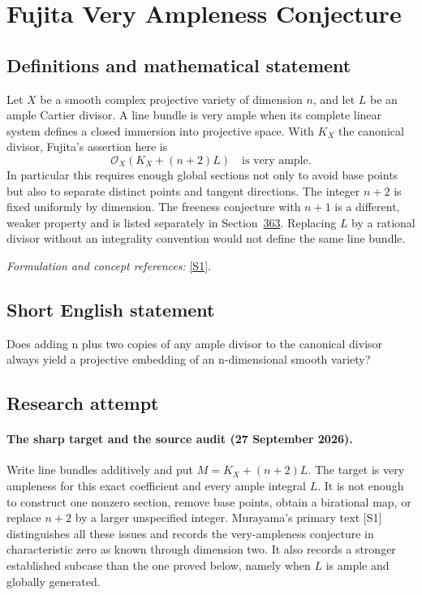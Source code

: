 \documentclass[11pt]{article}
\begin{document}
\section*{\texorpdfstring{Fujita Very Ampleness Conjecture}{Fujita Very Ampleness Conjecture}}\label{466}
\subsection{Definitions and mathematical statement}
Let $X$ be a smooth complex projective variety of dimension $n$, and let $L$ be an ample Cartier divisor. A line bundle is very ample when its complete linear system defines a closed immersion into projective space. With $K_X$ the canonical divisor, Fujita's assertion here is
\[
 \mathcal O_X(K_X+(n+2)L)\quad\text{is very ample}.
\]
In particular this requires enough global sections not only to avoid base points but also to separate distinct points and tangent directions. The integer $n+2$ is fixed uniformly by dimension. The freeness conjecture with $n+1$ is a different, weaker property and is listed separately in Section~\href{https://mehmetmars7.github.io/Erdosproblems-llm-hunter/problem.html?type=open_problems&id=problem.fujita-freeness-conjecture}{363}. Replacing $L$ by a rational divisor without an integrality convention would not define the same line bundle.
\par\smallskip\textit{Formulation and concept references:} \href{https://arxiv.org/abs/2408.06530}{[S1]}.

\subsection{Short English statement}
Does adding n plus two copies of any ample divisor to the canonical divisor always yield a projective embedding of an n-dimensional smooth variety?
\subsection{Research attempt}

\paragraph{The sharp target and the source audit (27 September 2026).}
Write line bundles additively and put $M=K_X+(n+2)L$. The target is
very ampleness for this exact coefficient and every ample integral $L$.
It is not enough to construct one nonzero section, remove base points,
obtain a birational map, or replace $n+2$ by a larger unspecified integer.
Murayama's primary text [S1] distinguishes all these issues and records
the very-ampleness conjecture in characteristic zero as known through
dimension two. It also records a stronger established subcase than the
one proved below, namely when $L$ is ample and globally generated.
\end{document}
